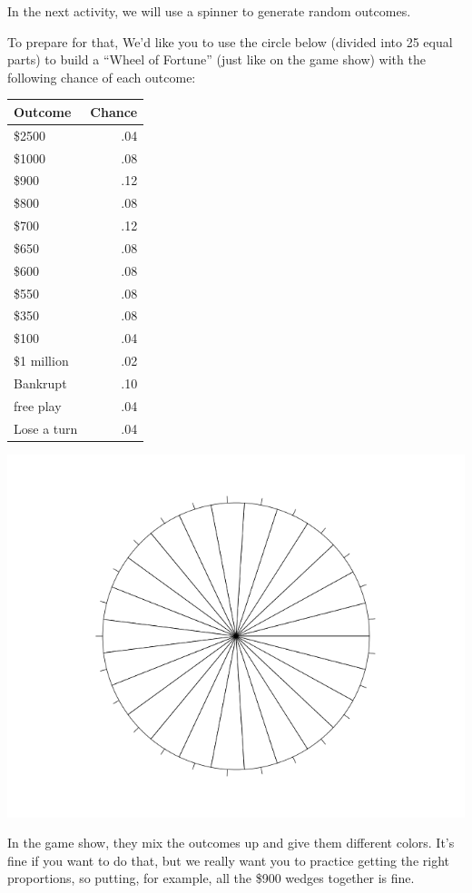 \newpage

In the next activity, we will use a spinner to generate random outcomes. 

To prepare for that, We'd like you to use the circle below (divided
 into 25 equal parts) to  build a ``Wheel of Fortune'' (just like on
 the game show)  with the following chance of each outcome:

\begin{tabular}{l|r}
Outcome & Chance\\ \hline
\$2500  & .04\\
\$1000  & .08\\
\$900  & .12\\
\$800  & .08\\
\$700  & .12\\
\$650  & .08\\
\$600  & .08\\
\$550  & .08\\
\$350  & .08\\
\$100 & .04\\
\$1 million & .02\\
Bankrupt  & .10\\
free play & .04\\
Lose a turn& .04\\
\hline
\end{tabular}
\begin{minipage}{.70\linewidth}
\includegraphics[width = 6in]{../plots/wheelOfFortune.png}
\end{minipage}

In the game show, they mix the outcomes up and give them different
colors. It's fine if you want to do that, but we really want you to
practice getting the right proportions, so putting, for example, all
the \$900 wedges together is fine.


